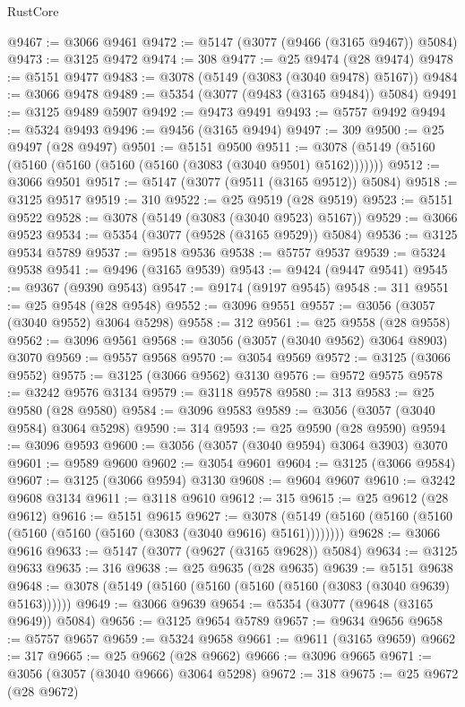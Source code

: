 \begin{lexlean}{RustCore}
\begin{coremodule}
@9467 := @3066 @9461
@9472 := @5147 (@3077 (@9466 (@3165 @9467)) @5084)
@9473 := @3125 @9472
@9474 := 308
@9477 := @25 @9474 (@28 @9474)
@9478 := @5151 @9477
@9483 := @3078 (@5149 (@3083 (@3040 @9478) @5167))
@9484 := @3066 @9478
@9489 := @5354 (@3077 (@9483 (@3165 @9484)) @5084)
@9491 := @3125 @9489 @5907
@9492 := @9473 @9491
@9493 := @5757 @9492
@9494 := @5324 @9493
@9496 := @9456 (@3165 @9494)
@9497 := 309
@9500 := @25 @9497 (@28 @9497)
@9501 := @5151 @9500
@9511 := @3078 (@5149 (@5160 (@5160 (@5160 (@5160 (@5160 (@3083 (@3040 @9501) @5162)))))))
@9512 := @3066 @9501
@9517 := @5147 (@3077 (@9511 (@3165 @9512)) @5084)
@9518 := @3125 @9517
@9519 := 310
@9522 := @25 @9519 (@28 @9519)
@9523 := @5151 @9522
@9528 := @3078 (@5149 (@3083 (@3040 @9523) @5167))
@9529 := @3066 @9523
@9534 := @5354 (@3077 (@9528 (@3165 @9529)) @5084)
@9536 := @3125 @9534 @5789
@9537 := @9518 @9536
@9538 := @5757 @9537
@9539 := @5324 @9538
@9541 := @9496 (@3165 @9539)
@9543 := @9424 (@9447 @9541)
@9545 := @9367 (@9390 @9543)
@9547 := @9174 (@9197 @9545)
@9548 := 311
@9551 := @25 @9548 (@28 @9548)
@9552 := @3096 @9551
@9557 := @3056 (@3057 (@3040 @9552) @3064 @5298)
@9558 := 312
@9561 := @25 @9558 (@28 @9558)
@9562 := @3096 @9561
@9568 := @3056 (@3057 (@3040 @9562) @3064 @8903) @3070
@9569 := @9557 @9568
@9570 := @3054 @9569
@9572 := @3125 (@3066 @9552)
@9575 := @3125 (@3066 @9562) @3130
@9576 := @9572 @9575
@9578 := @3242 @9576 @3134
@9579 := @3118 @9578
@9580 := 313
@9583 := @25 @9580 (@28 @9580)
@9584 := @3096 @9583
@9589 := @3056 (@3057 (@3040 @9584) @3064 @5298)
@9590 := 314
@9593 := @25 @9590 (@28 @9590)
@9594 := @3096 @9593
@9600 := @3056 (@3057 (@3040 @9594) @3064 @3903) @3070
@9601 := @9589 @9600
@9602 := @3054 @9601
@9604 := @3125 (@3066 @9584)
@9607 := @3125 (@3066 @9594) @3130
@9608 := @9604 @9607
@9610 := @3242 @9608 @3134
@9611 := @3118 @9610
@9612 := 315
@9615 := @25 @9612 (@28 @9612)
@9616 := @5151 @9615
@9627 := @3078 (@5149 (@5160 (@5160 (@5160 (@5160 (@5160 (@5160 (@3083 (@3040 @9616) @5161))))))))
@9628 := @3066 @9616
@9633 := @5147 (@3077 (@9627 (@3165 @9628)) @5084)
@9634 := @3125 @9633
@9635 := 316
@9638 := @25 @9635 (@28 @9635)
@9639 := @5151 @9638
@9648 := @3078 (@5149 (@5160 (@5160 (@5160 (@5160 (@3083 (@3040 @9639) @5163))))))
@9649 := @3066 @9639
@9654 := @5354 (@3077 (@9648 (@3165 @9649)) @5084)
@9656 := @3125 @9654 @5789
@9657 := @9634 @9656
@9658 := @5757 @9657
@9659 := @5324 @9658
@9661 := @9611 (@3165 @9659)
@9662 := 317
@9665 := @25 @9662 (@28 @9662)
@9666 := @3096 @9665
@9671 := @3056 (@3057 (@3040 @9666) @3064 @5298)
@9672 := 318
@9675 := @25 @9672 (@28 @9672)

\end{coremodule}
\end{lexlean}
